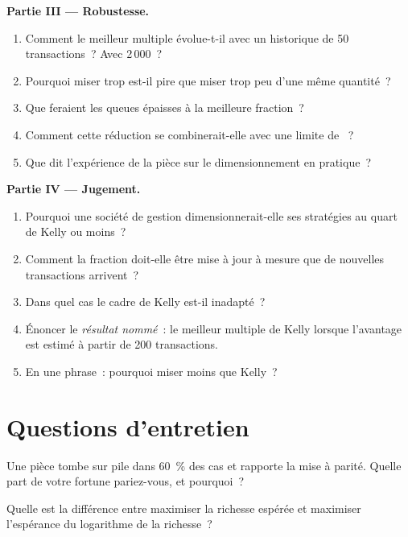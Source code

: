 \begin{problem}
\medskip\noindent\textbf{Partie III --- Robustesse.}
\begin{enumerate}[resume]
\item Comment le meilleur multiple évolue-t-il avec un historique de 50 transactions~? Avec 2\,000~?
\item Pourquoi miser trop est-il pire que miser trop peu d'une même quantité~?
\item Que feraient les queues épaisses à la meilleure fraction~?
\item Comment cette réduction se combinerait-elle avec une limite de ~?
\item Que dit l'expérience de la pièce sur le dimensionnement en pratique~?
\end{enumerate}

\medskip\noindent\textbf{Partie IV --- Jugement.}
\begin{enumerate}[resume]
\item Pourquoi une société de gestion dimensionnerait-elle ses stratégies au quart de Kelly ou moins~?
\item Comment la fraction doit-elle être mise à jour à mesure que de nouvelles transactions arrivent~?
\item Dans quel cas le cadre de Kelly est-il inadapté~?
\item Énoncer le \emph{résultat nommé}~: le meilleur multiple de Kelly lorsque l'avantage est
estimé à partir de 200 transactions.
\item En une phrase~: pourquoi miser moins que Kelly~?
\end{enumerate}
\end{problem}

\section{Questions d'entretien}

\begin{interviewq}\label{iq:m2:thinking-in-expected-value:1}
Une pièce tombe sur pile dans 60~\% des cas et rapporte la mise à parité. Quelle part de votre
fortune pariez-vous, et pourquoi~?
\end{interviewq}

\begin{interviewq}\label{iq:m2:thinking-in-expected-value:2}
Quelle est la différence entre maximiser la richesse espérée et maximiser l'espérance
du logarithme de la richesse~?
\end{interviewq}

